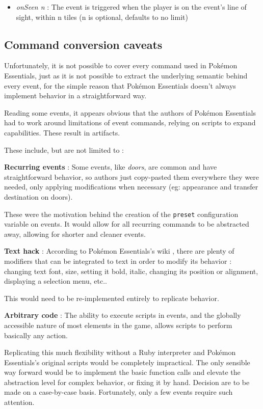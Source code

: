 \documentclass[11pt]{article}
\begin{document}
{\begin{itemize}
\begin{itemize}
		\item \textit{onSeen n} : The event is triggered when the player is on the event's line of sight, within n tiles (n is optional, defaults to no limit)
	\end{itemize}
	
\end{itemize}





\subsection{Command conversion caveats} %

Unfortunately, it is not possible to cover every command used in Pokémon Essentials, just as it is not possible to extract the underlying semantic behind every event, for the simple reason that Pokémon Essentials doesn't always implement behavior in a straightforward way.

Reading some events, it appears obvious that the authors of Pokémon Essentials had to work around limitations of event commands, relying on scripts to expand capabilities. These result in artifacts.

These include, but are not limited to :

\textbf{Recurring events} : Some events, like \textit{doors}, are common and have straightforward behavior, so authors just copy-pasted them everywhere they were needed, only applying modifications when necessary (eg: appearance and transfer destination on doors).

These were the motivation behind the creation of the \verb|preset| configuration variable on events. It would allow for all recurring commands to be abstracted away, allowing for shorter and cleaner events.

\textbf{Text hack} : According to Pokémon Essentials's wiki \cite{PEmessages}, there are plenty of modifiers that can be integrated to text in order to modify its behavior : changing text font, size, setting it bold, italic, changing its position or alignment, displaying a selection menu, etc..

This would need to be re-implemented entirely to replicate behavior.

\textbf{Arbitrary code} : The ability to execute scripts in events, and the globally accessible nature of most elements in the game, allows scripts to perform basically any action.

Replicating this much flexibility without a Ruby interpreter and Pokémon Essentials's original scripts would be completely impractical. The only sensible way forward would be to implement the basic function calls and elevate the abstraction level for complex behavior, or fixing it by hand. Decision are to be made on a case-by-case basis. Fortunately, only a few events require such attention.

}
\end{document}
